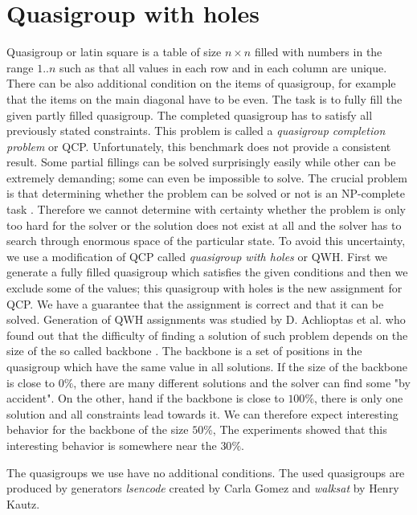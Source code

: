 \section{Quasigroup with holes}
Quasigroup or latin square is a table of size $n \times n$ filled with numbers in the
range $1..n$ such as that all values in each row and in each column are unique. There
can be also additional condition on the items of quasigroup, for example that the 
items on the main diagonal have to be even. The task is to fully fill the 
given partly filled quasigroup. The completed quasigroup has to satisfy all previously
stated constraints. This problem is called a {\em quasigroup completion problem} or QCP.
Unfortunately, this benchmark does not provide a consistent result. Some partial fillings
can be solved surprisingly easily while other can be extremely demanding; 
some can even be impossible to solve. The crucial problem is that determining whether the problem can
be solved or not is an NP-complete task \cite{Achlioptas00generatingsatisfiable}. Therefore we cannot determine with certainty whether the problem is only
too hard for the solver or the solution does not exist at all and the solver has to search 
through enormous space of the particular state. To avoid this uncertainty, we use a modification of
QCP called {\em quasigroup with holes} or QWH. First we generate a fully filled quasigroup
which satisfies the given conditions and then we exclude some of the values; this quasigroup
with holes is the new assignment for QCP. We have a guarantee that the assignment is correct
and that it can be solved. Generation of QWH assignments was studied by D. Achlioptas
et al. who found out that the difficulty of finding a solution of such problem depends on the size of the
so called backbone \cite{Achlioptas00generatingsatisfiable}. The backbone is a set 
of positions in the quasigroup which have the same value in all solutions.
If the size of the backbone is close to $0 \%$, there are many different solutions and
the solver can find some "by accident". On the other, hand if the backbone is close
to $100 \%$, there is only one solution and all constraints lead towards it.
We can therefore expect interesting behavior for the backbone of the size $50 \%$,
The experiments \cite{Achlioptas00generatingsatisfiable} showed that this interesting 
behavior is somewhere near the $30 \%$.

The quasigroups we use have no additional conditions. The used quasigroups are produced
by generators {\em lsencode} created by Carla Gomez and {\em walksat} by Henry Kautz. 
 

